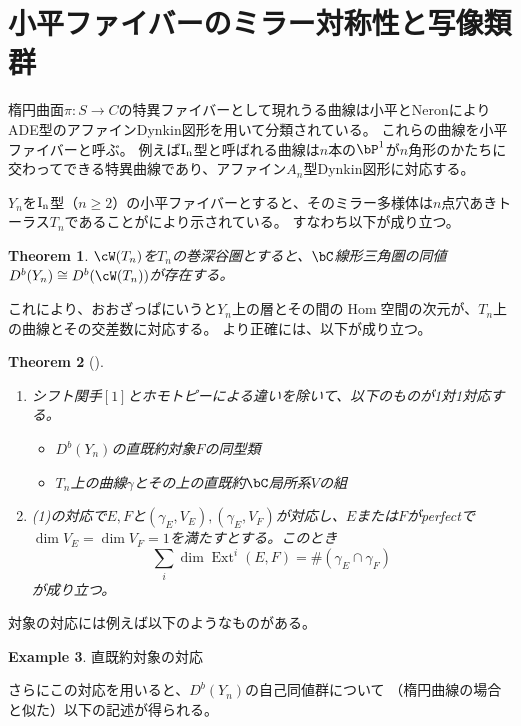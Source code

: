 \documentclass[uplatex,a4paper,dvipdfmx]{jsarticle}
\theoremstyle{plain}
\newtheorem{theorem}{Theorem}[section]
\theoremstyle{definition}
\newtheorem{example}[theorem]{Example}
\DeclareMathOperator{\Hom}{\mathrm{Hom}}
\DeclareMathOperator{\Ext}{\mathrm{Ext}}
\begin{document}
\section{小平ファイバーのミラー対称性と写像類群}
楕円曲面$\pi \colon S \to C$の特異ファイバーとして現れうる曲線は小平とNeronによりADE型のアファインDynkin図形を用いて分類されている。
これらの曲線を小平ファイバーと呼ぶ。
例えば$\rm{I}_n$型と呼ばれる曲線は$n$本の$\bP^1$が$n$角形のかたちに交わってできる特異曲線であり、アファイン$A_n$型Dynkin図形に対応する。



$Y_n$を$\rm{I}_n$型（$n \geq 2$）の小平ファイバーとすると、そのミラー多様体は$n$点穴あきトーラス$T_n$であることが\cite{MR3663596}により示されている。
すなわち以下が成り立つ。
\begin{theorem}\cite{MR3663596}
	$\cW(T_n)$を$T_n$の巻深谷圏とすると、$\bC$線形三角圏の同値$D^b(Y_n) \cong D^b(\cW(T_n))$が存在する。
\end{theorem}
これにより、おおざっぱにいうと$Y_n$上の層とその間の$\Hom$空間の次元が、$T_n$上の曲線とその交差数に対応する。
より正確には、以下が成り立つ。
\begin{theorem}[\cite{2020arXiv201108288O}]
	\begin{enumerate}
		\item シフト関手$[1]$とホモトピーによる違いを除いて、以下のものが1対1対応する。\begin{itemize}
			      \item $D^b(Y_n)$の直既約対象$F$の同型類
			      \item $T_n$上の曲線$\gamma$とその上の直既約$\bC$局所系$V$の組
		      \end{itemize}
		\item (1)の対応で$E,F$と$(\gamma_E, V_E), (\gamma_E, V_F)$が対応し、$E$または$F$がperfectで$\dim V_E = \dim V_F = 1$を満たすとする。このとき\begin{equation}
			      \sum_{i}\dim\Ext^i(E, F) = \#(\gamma_E \cap \gamma_F)
		      \end{equation}が成り立つ。
	\end{enumerate}
\end{theorem}
対象の対応には例えば以下のようなものがある。
\begin{example}
	直既約対象の対応
\end{example}
さらにこの対応を用いると、$D^b(Y_n)$の自己同値群について
（楕円曲線の場合と似た）以下の記述が得られる。
\end{document}
